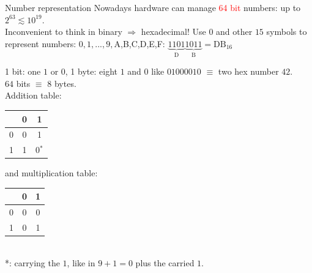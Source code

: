 \documentclass[10pt]{beamer}
\newcommand{\red}[1]{\textcolor{red}{#1}}
\renewcommand{\[}{\begin{equation*}}
\renewcommand{\]}{\end{equation*}}
\begin{document}
\begin{frame}{Number representation}
Nowadays hardware can manage \red{64 bit} numbers: up to $2^{63}\lesssim 10^{19}$.\\
Inconvenient to think in binary $\Rightarrow$ hexadecimal! Use $0$ and other $15$ symbols to represent numbers: $0,1,...,9,$A,B,C,D,E,F: 
$
\underbrace{1101}_{\text{D}}\underbrace{1011}_{\text{B}} = \text{DB}_{16}
$

1 bit: one $1$ or $0$, 1 byte: eight $1$ and $0$ like $01000010$ $\equiv$ two hex number $42$.\\
$64$ bits $\equiv$ $8$ bytes.\\
Addition table: \begin{tabular}{c|c|c}
  & 0 & 1 \\
  \hline
0 & 0 & 1\\
1 & 1 & 0$^*$
\end{tabular}  and multiplication table: \begin{tabular}{c|c|c}
  & 0 & 1 \\
  \hline
0 & 0 & 0\\
1 & 0 & 1
\end{tabular}\\
*: carrying the $1$, like in $9+1 = 0$ plus the carried $1$.

\end{frame}
\end{document}
